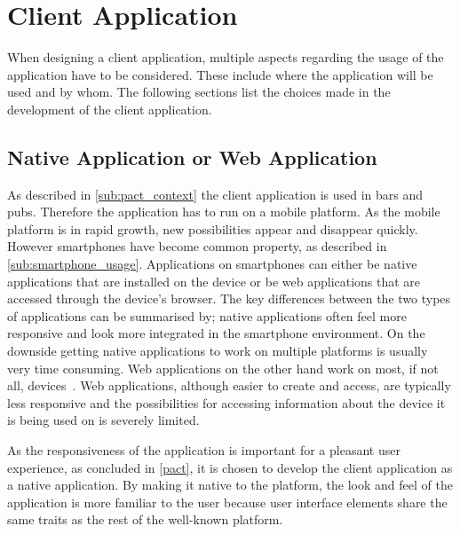 \section{Client Application}
\label{ssub:client_application}

When designing a client application, multiple aspects regarding the usage of the application have to be considered. These include where the application will be used and by whom. The following sections list the choices made in the development of the client application.

\subsection{Native Application or Web Application}
\label{par:native_application_or_web_application}

As described in \cref{sub:pact_context} the client application is used in bars and pubs. Therefore the application has to run on a mobile platform. As the mobile platform is in rapid growth, new possibilities appear and disappear quickly. However smartphones have become common property, as described in \cref{sub:smartphone_usage}. Applications on smartphones can either be native applications that are installed on the device or be web applications that are accessed through the device's browser. The key differences between the two types of applications can be summarised by; native applications often feel more responsive and look more integrated in the smartphone environment. On the downside  getting native applications to work on multiple platforms is usually very time consuming. Web applications on the other hand work on most, if not all, devices~\cite{charland2011mobile}. Web applications, although easier to create and access, are typically less responsive and the possibilities for accessing information about the device it is being used on is severely limited.

As the responsiveness of the application is important for a pleasant user experience, as concluded in \cref{pact}, it is chosen to develop the client application as a native application. By making it native to the platform, the look and feel of the application is more familiar to the user because user interface elements share the same traits as the rest of the well-known platform.